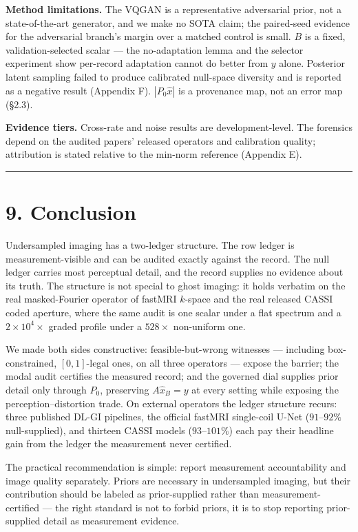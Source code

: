 \documentclass[11pt]{article}
\begin{document}
\textbf{Method limitations.} The VQGAN is a representative adversarial prior, not a state-of-the-art generator, and we make no SOTA claim; the paired-seed evidence for the adversarial branch's margin over a matched control is small. $B$ is a fixed, validation-selected scalar --- the no-adaptation lemma and the selector experiment show per-record adaptation cannot do better from $y$ alone. Posterior latent sampling failed to produce calibrated null-space diversity and is reported as a negative result (Appendix F). $|P_0\hat{x}|$ is a provenance map, not an error map (§2.3).

\textbf{Evidence tiers.} Cross-rate and noise results are development-level. The forensics depend on the audited papers' released operators and calibration quality; attribution is stated relative to the min-norm reference (Appendix E).

\medskip\hrule\medskip

\section*{9. Conclusion}

Undersampled imaging has a two-ledger structure. The row ledger is measurement-visible and can be audited exactly against the record. The null ledger carries most perceptual detail, and the record supplies no evidence about its truth. The structure is not special to ghost imaging: it holds verbatim on the real masked-Fourier operator of fastMRI $k$-space and the real released CASSI coded aperture, where the same audit is one scalar under a flat spectrum and a $2\times10^4\times$ graded profile under a $528\times$ non-uniform one.

We made both sides constructive: feasible-but-wrong witnesses --- including box-constrained, $[0,1]$-legal ones, on all three operators --- expose the barrier; the modal audit certifies the measured record; and the governed dial supplies prior detail only through $P_0$, preserving $A\hat{x}_B = y$ at every setting while exposing the perception--distortion trade. On external operators the ledger structure recurs: three published DL-GI pipelines, the official fastMRI single-coil U-Net ($91$--$92\%$ null-supplied), and thirteen CASSI models ($93$--$101\%$) each pay their headline gain from the ledger the measurement never certified.

The practical recommendation is simple: report measurement accountability and image quality separately. Priors are necessary in undersampled imaging, but their contribution should be labeled as prior-supplied rather than measurement-certified --- the right standard is not to forbid priors, it is to stop reporting prior-supplied detail as measurement evidence.
\end{document}
